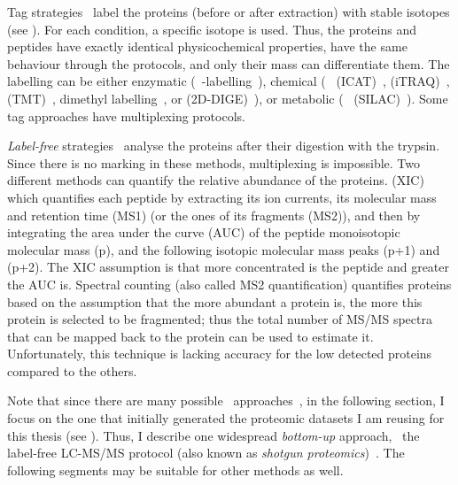 Tag strategies~ label the proteins (before or after extraction)
with stable isotopes (see ).
For each condition, a specific isotope is used.
Thus, the proteins and peptides
have exactly identical physicochemical properties,
have the same behaviour through the protocols, and
only their mass can differentiate them.
The labelling can be either
enzymatic (\eg\ -labelling~),
chemical (\eg\  (\gls{ICAT})~,
 (\gls{iTRAQ})~,
 (\gls{TMT})~,
dimethyl labelling~,
or  (\gls{2D-DIGE})~),
or metabolic (\eg\  (\gls{SILAC})~).
Some tag approaches have multiplexing protocols.\mybr\

\emph{Label-free} strategies~
analyse the proteins after their digestion with the trypsin.
Since there is no marking in these methods, multiplexing is impossible.
Two different methods can quantify the relative abundance of the proteins.
 (\gls{XIC})~
which quantifies each peptide by extracting its ion currents,
its molecular mass and retention time (MS1) (or the ones of its fragments (MS2)),
and then by integrating the area under the curve (\gls{AUC}) of the peptide
monoisotopic molecular mass (p),
and the following isotopic molecular mass peaks (p+1) and (p+2).
The \gls{XIC} assumption is that more concentrated is the peptide and
greater the \gls{AUC} is.
Spectral counting (also called MS2 quantification)
quantifies proteins based on the assumption that
the more abundant a protein is, the more this protein is selected to be fragmented;
thus the total number of \gls{MS/MS} spectra that can be mapped back to
the protein can be used to estimate it.
Unfortunately, this technique is lacking accuracy for the low detected proteins
compared to the others.\mybr\

Note that since there are many possible \ms\ approaches~,
in the following section, I focus on the one
that initially generated the proteomic datasets
I am reusing for this thesis (see ).
Thus, I describe one widespread \emph{bottom-up} approach,
\ie\ the label-free \gls{LC-MS/MS} protocol
(also known as \emph{shotgun proteomics})~.
The following segments may be suitable for other methods as well.\mybr\

